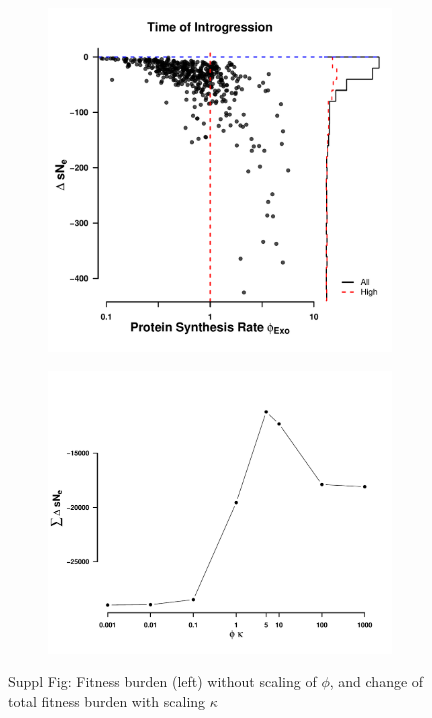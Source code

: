 \documentclass[12pt]{article}
\begin{document}
\begin{figure}[h]
    \centering
    \begin{subfigure}
        \centering
        \includegraphics[width=.45\textwidth]{img/fitness_difference_gos_kappa1.pdf}
    \end{subfigure}
    \begin{subfigure}
        \centering
        \includegraphics[width=.45\textwidth]{img/fitness_phi_scaling_gos.pdf}
    \end{subfigure}
    \caption{Suppl Fig: Fitness burden (left) without scaling of $\phi$, and change of total fitness burden with scaling $\kappa$}
    \label{fig:sne_scaling}
\end{figure}
\end{document}
